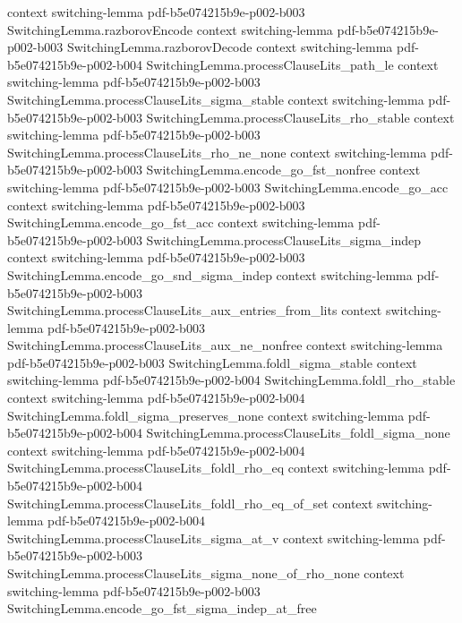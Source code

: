 \begin{lemma}
  {context}
  {switching-lemma}
  {pdf-b5e074215b9e-p002-b003}
\proofstep
  {SwitchingLemma.razborovEncode}
  {context}
  {switching-lemma}
  {pdf-b5e074215b9e-p002-b003}
\proofstep
  {SwitchingLemma.razborovDecode}
  {context}
  {switching-lemma}
  {pdf-b5e074215b9e-p002-b004}
\proofstep
  {SwitchingLemma.processClauseLits_path_le}
  {context}
  {switching-lemma}
  {pdf-b5e074215b9e-p002-b003}
\proofstep
  {SwitchingLemma.processClauseLits_sigma_stable}
  {context}
  {switching-lemma}
  {pdf-b5e074215b9e-p002-b003}
\proofstep
  {SwitchingLemma.processClauseLits_rho_stable}
  {context}
  {switching-lemma}
  {pdf-b5e074215b9e-p002-b003}
\proofstep
  {SwitchingLemma.processClauseLits_rho_ne_none}
  {context}
  {switching-lemma}
  {pdf-b5e074215b9e-p002-b003}
\proofstep
  {SwitchingLemma.encode_go_fst_nonfree}
  {context}
  {switching-lemma}
  {pdf-b5e074215b9e-p002-b003}
\proofstep
  {SwitchingLemma.encode_go_acc}
  {context}
  {switching-lemma}
  {pdf-b5e074215b9e-p002-b003}
\proofstep
  {SwitchingLemma.encode_go_fst_acc}
  {context}
  {switching-lemma}
  {pdf-b5e074215b9e-p002-b003}
\proofstep
  {SwitchingLemma.processClauseLits_sigma_indep}
  {context}
  {switching-lemma}
  {pdf-b5e074215b9e-p002-b003}
\proofstep
  {SwitchingLemma.encode_go_snd_sigma_indep}
  {context}
  {switching-lemma}
  {pdf-b5e074215b9e-p002-b003}
\proofstep
  {SwitchingLemma.processClauseLits_aux_entries_from_lits}
  {context}
  {switching-lemma}
  {pdf-b5e074215b9e-p002-b003}
\proofstep
  {SwitchingLemma.processClauseLits_aux_ne_nonfree}
  {context}
  {switching-lemma}
  {pdf-b5e074215b9e-p002-b003}
\proofstep
  {SwitchingLemma.foldl_sigma_stable}
  {context}
  {switching-lemma}
  {pdf-b5e074215b9e-p002-b004}
\proofstep
  {SwitchingLemma.foldl_rho_stable}
  {context}
  {switching-lemma}
  {pdf-b5e074215b9e-p002-b004}
\proofstep
  {SwitchingLemma.foldl_sigma_preserves_none}
  {context}
  {switching-lemma}
  {pdf-b5e074215b9e-p002-b004}
\proofstep
  {SwitchingLemma.processClauseLits_foldl_sigma_none}
  {context}
  {switching-lemma}
  {pdf-b5e074215b9e-p002-b004}
\proofstep
  {SwitchingLemma.processClauseLits_foldl_rho_eq}
  {context}
  {switching-lemma}
  {pdf-b5e074215b9e-p002-b004}
\proofstep
  {SwitchingLemma.processClauseLits_foldl_rho_eq_of_set}
  {context}
  {switching-lemma}
  {pdf-b5e074215b9e-p002-b004}
\proofstep
  {SwitchingLemma.processClauseLits_sigma_at_v}
  {context}
  {switching-lemma}
  {pdf-b5e074215b9e-p002-b003}
\proofstep
  {SwitchingLemma.processClauseLits_sigma_none_of_rho_none}
  {context}
  {switching-lemma}
  {pdf-b5e074215b9e-p002-b003}
\proofstep
  {SwitchingLemma.encode_go_fst_sigma_indep_at_free}

\end{lemma}
